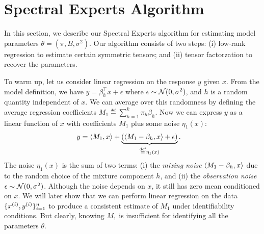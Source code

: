 \section{Spectral Experts Algorithm}
\label{sec:algo}

In this section, we describe our Spectral Experts algorithm
for estimating model parameters $\theta = (\pi, B, \sigma^2)$.
Our algorithm consists of two steps:
(i) low-rank regression to estimate certain symmetric tensors;
and (ii) tensor factorzation to recover the parameters.

To warm up, let us consider linear regression
on the response $y$ given $x$.
From the model definition, we have $y = \beta_h^\top x + \epsilon$ where
$\epsilon \sim \mathcal{N}(0, \sigma^2)$, and $h$ is a random quantity
independent of $x$.
We can average over this randomness by defining
the average regression coefficients
$M_1 \eqdef \sum_{h=1}^k \pi_h \beta_h$.
Now we can express $y$ as a linear function of $x$ with coefficients $M_1$
plus some noise $\eta_1(x)$:
\begin{align}
  y &= \langle M_1, x \rangle +
  \underbrace{(\langle M_1 - \beta_h, x \rangle + \epsilon)}_{\stackrel{\rm def}{=} \eta_1(x)}.
\end{align}
The noise $\eta_1(x)$ is the sum of two terms:
(i) the \emph{mixing noise} $\langle M_1 - \beta_h, x \rangle$
due to the random choice of the mixture component $h$,
and (ii) the \emph{observation noise} $\epsilon \sim \mathcal{N}(0, \sigma^2)$.
Although the noise depends on $x$,
it still has zero mean conditioned on $x$.
We will later show that we can
perform linear regression on the data $\{x^{(i)},
y^{(i)}\}_{i=1}^{n}$ to produce a consistent estimate of $M_1$
under identifiability conditions.
But clearly, knowing $M_1$ is insufficient
for identifying all the parameters $\theta$.

